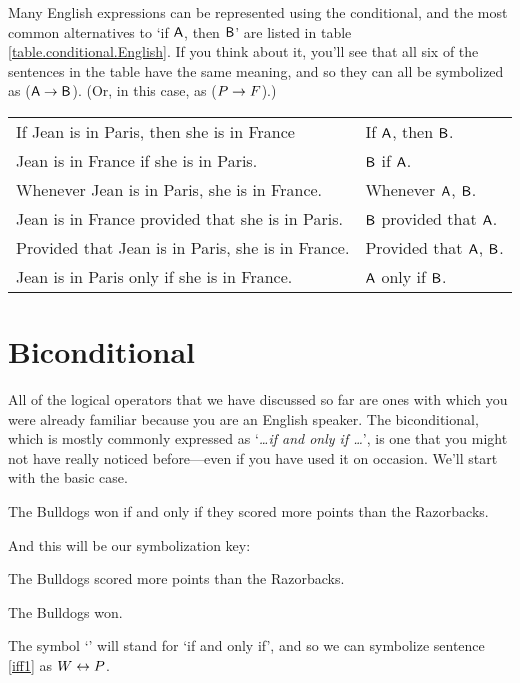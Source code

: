 Many English expressions can be represented using the conditional, and the most common alternatives to `if $\mathsf{A}$, then $\mathsf{B}$' are listed in table \ref{table.conditional.English}. If you think about it, you'll see that all six of the sentences in the table have the same meaning, and so they can all be symbolized as ($\mathsf{A} \rightarrow \mathsf{B}$). (Or, in this case, as ($P \rightarrow F$).)


\begin{table*}\centering\sffamily\footnotesize
{}
\begin{tabular}{@{}l l@{}}\toprule
If Jean is in Paris, then she is in France & If $\mathsf{A}$, then $\mathsf{B}$.\\
Jean is in France if she is in Paris. 	&	$\mathsf{B}$ if $\mathsf{A}$.\\
Whenever Jean is in Paris, she is in France.  	&	Whenever $\mathsf{A}$, $\mathsf{B}$.\\
Jean is in France provided that she is in Paris. 	&	$\mathsf{B}$ provided that $\mathsf{A}$.\\
Provided that Jean is in Paris, she is in France. 	&	Provided that $\mathsf{A}$, $\mathsf{B}$.\\
Jean is in Paris only if she is in France. 	&	$\mathsf{A}$ only if $\mathsf{B}$.\\
\bottomrule
\end{tabular}
\caption{The most common way of expressing a conditional in English is as `If Jean is in Paris, then she is in France.' This table lists some alternative but equivalent ways of expressing the same sentence.}\label{table.conditional.English}
\end{table*}


\section{Biconditional}\label{s:biconditional-1}

All of the logical operators that we have discussed so far are ones with which you were already familiar because you are an English speaker. The biconditional, which is mostly commonly expressed as `\textit{\ldots if and only if \ldots}', is one that you might not have really noticed before---even if you have used it on occasion. We'll start with the basic case.
	\begin{earg}
		\item[\ex{iff1}] The Bulldogs won if and only if they scored more points than the Razorbacks.
	\end{earg}
And this will be our symbolization key:
	\begin{ekey}
		\item[P] The Bulldogs scored more points than the Razorbacks.
		\item[W] The Bulldogs won.
	\end{ekey}
The symbol `\eiff' will stand for `if and only if', and so we can symbolize sentence \ref{iff1} as $W \leftrightarrow P$.

